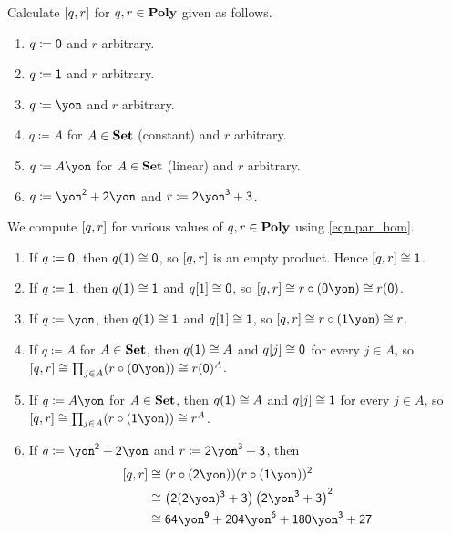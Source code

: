 \documentclass[Book-Poly]{subfiles}
\begin{document}
\begin{exercise}
Calculate $[q,r]$ for $q,r\in\mathbf{Poly}$ given as follows.
\begin{enumerate}
	\item $q\coloneqq \textsf{0}$ and $r$ arbitrary.
	\item $q\coloneqq \textsf{1}$ and $r$ arbitrary.
	\item $q\coloneqq\yon$ and $r$ arbitrary.
	\item $q\coloneqq A$ for $A\in\mathbf{Set}$ (constant) and $r$ arbitrary.
	\item $q\coloneqq A\yon$ for $A\in\mathbf{Set}$ (linear) and $r$ arbitrary.
	\item $q\coloneqq\yon^\2+\2\yon$ and $r\coloneqq\2\yon^\3+\3$.
\qedhere
\end{enumerate}
\begin{solution}
We compute $[q,r]$ for various values of $q, r \in \mathbf{Poly}$ using \eqref{eqn.par_hom}.
\begin{enumerate}
    \item If $q \coloneqq \textsf{0}$, then $q(\textsf{1}) \cong \textsf{0}$, so $[q,r]$ is an empty product.
    Hence $[q,r] \cong \textsf{1}$.
    \item If $q \coloneqq \textsf{1}$, then $q(\textsf{1}) \cong \textsf{1}$ and $q[1] \cong \textsf{0}$, so $\ihom{q,r} \iso r \circ (\0\yon) \iso r(\0)$.
    \item If $q \coloneqq \yon$, then $q(\textsf{1}) \cong \textsf{1}$ and $q[1] \cong \textsf{1}$, so $\ihom{q,r} \iso r \circ (\1\yon) \iso r$.
	\item If $q \coloneqq A$ for $A \in \mathbf{Set}$, then $q(\textsf{1}) \cong A$ and $q[j] \cong \textsf{0}$ for every $j \in A$, so $\ihom{q,r} \iso \prod_{j \in A} (r \circ (\0\yon)) \iso r(\0)^A$.
	\item If $q \coloneqq A\yon$ for $A\in\mathbf{Set}$, then $q(\textsf{1}) \cong A$ and $q[j] \cong \textsf{1}$ for every $j \in A$, so $\ihom{q,r} \iso \prod_{j \in A} (r \circ (\1\yon)) \iso r^A$.
	\item If $q\coloneqq\yon^\2+\2\yon$ and $r\coloneqq\2\yon^\3+\3$, then
	\begin{align*}
	    \ihom{q,r} &\iso (r \circ (\2\yon))(r \circ (\1\yon))^\2 \\
	    &\iso \left(\2(\2\yon)^\3 + \3\right)\left(\2\yon^\3 + \3\right)^\2 \\
	    &\iso \6\4\yon^\9 + \2\0\4\yon^\6 + \1\8\0\yon^\3 + \2\7 \\
	\end{align*}
\end{enumerate}
\end{solution}
\end{exercise}
\end{document}
